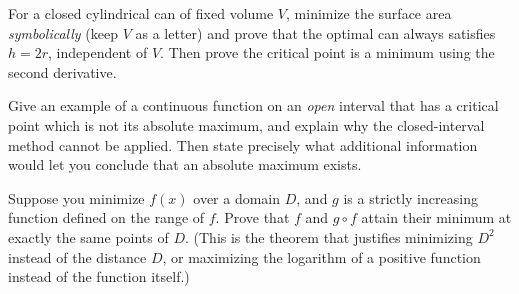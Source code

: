 \begin{exercise}[Why $h=2r$, in general]
For a closed cylindrical can of fixed volume $V$, minimize the surface area
\emph{symbolically} (keep $V$ as a letter) and prove that the optimal can always
satisfies $h = 2r$, independent of $V$. Then prove the critical point is a minimum
using the second derivative.
\end{exercise}

\begin{exercise}
Give an example of a continuous function on an \emph{open} interval that has a
critical point which is not its absolute maximum, and explain why the closed-interval
method cannot be applied. Then state precisely what additional information would let
you conclude that an absolute maximum exists.
\end{exercise}

\begin{exercise}
Suppose you minimize $f(x)$ over a domain $D$, and $g$ is a strictly increasing
function defined on the range of $f$. Prove that $f$ and $g\circ f$ attain their
minimum at exactly the same points of $D$. (This is the theorem that justifies
minimizing $D^2$ instead of the distance $D$, or maximizing the logarithm of a
positive function instead of the function itself.)
\end{exercise}
